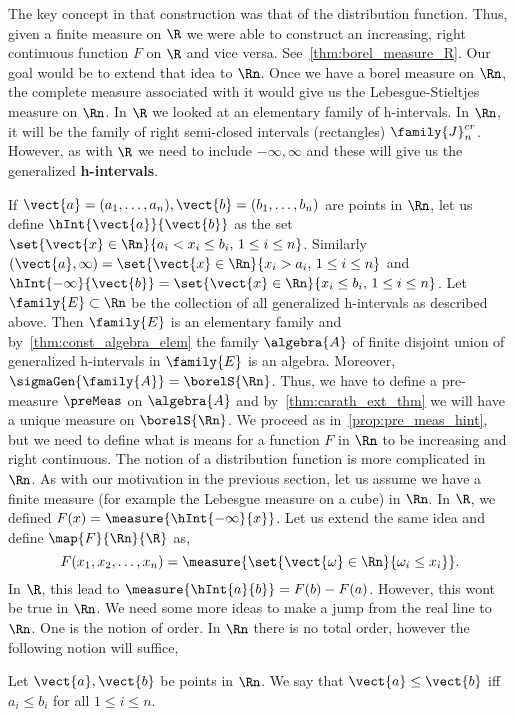 The
key concept in that construction was that of the distribution function. Thus, given a finite measure
on $\R$ we were able to construct an increasing, right continuous function $F$ on $\R$ and vice
versa. See~\ref{thm:borel_measure_R}. Our goal would be to extend that idea to $\Rn$. Once we have a
borel measure on $\Rn$, the complete measure associated with it would give us the Lebesgue-Stieltjes
measure on $\Rn$. In $\R$ we looked at an elementary family of h-intervals. In $\Rn$, it will be the
family of right semi-closed intervals (rectangles) $\family{J}_n^{cr}$. 
However, as with $\R$ we need to include
$-\infty,\infty$ and these will give us the generalized \textbf{h-intervals}. 

If $\vect{a} = (a_1,\dots,a_n), \vect{b} = (b_1,\dots,b_n)$ are points in $\Rn$,
let us define $\hInt{\vect{a}}{\vect{b}}$ as the set $\set{\vect{x}\in\Rn}{a_i< x_i \leq b_i,\,1\leq
i\leq n}$. Similarly $(\vect{a},\infty) = \set{\vect{x}\in\Rn}{x_i > a_i,\,1\leq i \leq n}$ and 
$\hInt{-\infty}{\vect{b}} = \set{\vect{x}\in\Rn}{x_i\leq b_i,\,1\leq i\leq n}$.
Let $\family{E} \subset \Rn$ be the collection of all generalized h-intervals as described above.
Then $\family{E}$ is an elementary family and by~\ref{thm:const_algebra_elem} the family
$\algebra{A}$ of finite disjoint union of generalized h-intervals in $\family{E}$ is an algebra.
Moreover, $\sigmaGen{\family{A}} = \borelS{\Rn}$. Thus, we have to define a pre-measure $\preMeas$
on $\algebra{A}$ and by~\ref{thm:carath_ext_thm} we will have a unique measure on $\borelS{\Rn}$. We
proceed as in~\ref{prop:pre_meas_hint}, but we need to define what is means for a function $F$ in
$\Rn$ to be increasing and right continuous. The notion of a distribution function is more
complicated in $\Rn$. As with our motivation in the previous section, let us assume we have a finite
measure (for example the Lebesgue measure on a cube) in $\Rn$. In $\R$, we defined $F(x) =
\measure{\hInt{-\infty}{x}}$. 
Let us extend the same idea and define $\map{F}{\Rn}{\R}$ as,
\[F(x_1,x_2,\dots,x_n) = \measure{\set{\vect{\omega}\in\Rn}{\omega_{i}\leq x_i}}.\]
In $\R$, this lead to $\measure{\hInt{a}{b}} = F(b) - F(a)$. However, this wont be true in $\Rn$.
We need some more ideas to make a jump from the real line to $\Rn$. One is the notion of order. In
$\Rn$ there is no total order, however the following notion will suffice,
\begin{Definition}[name=Order in $\Rn$]
    Let $\vect{a},\vect{b}$ be points in $\Rn$. We say that $\vect{a}\leq\vect{b}$ iff $a_i\leq b_i$
    for all $1\leq i \leq n$.
\end{Definition}
